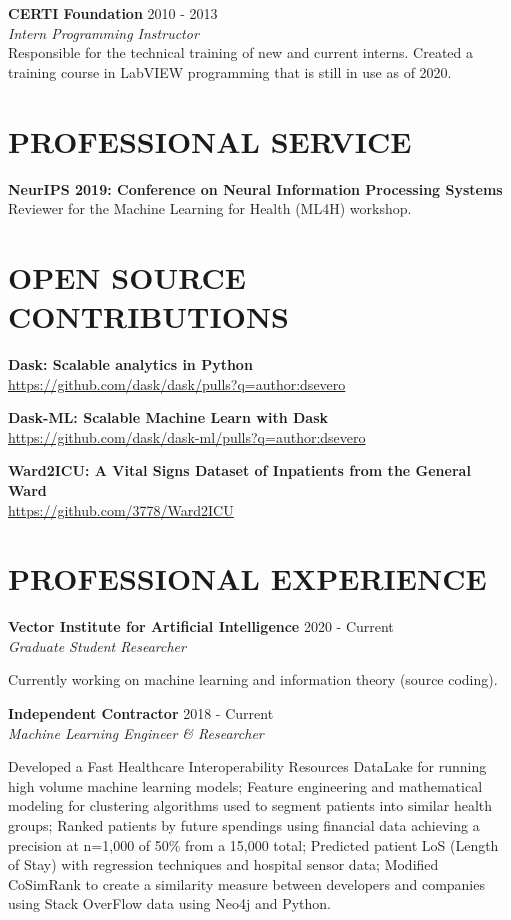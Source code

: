 \documentclass[margin, line]{res}
\begin{document}
\begin{resume}
\textbf{CERTI Foundation} \hfill 2010 - 2013\\
{\sl Intern Programming Instructor}\\
Responsible for the technical training of new and current interns. Created a training course in LabVIEW programming that is still in use as of 2020.

\section{PROFESSIONAL SERVICE}
\textbf{NeurIPS 2019: Conference on Neural Information Processing Systems}\\
Reviewer for the Machine Learning for Health (ML4H) workshop.

\section{OPEN SOURCE CONTRIBUTIONS}
\textbf{Dask: Scalable analytics in Python}\\
\url{https://github.com/dask/dask/pulls?q=author:dsevero}

\textbf{Dask-ML: Scalable Machine Learn with Dask}\\
\url{https://github.com/dask/dask-ml/pulls?q=author:dsevero}

\textbf{Ward2ICU: A Vital Signs Dataset of Inpatients from the General Ward}\\
\url{https://github.com/3778/Ward2ICU}

\section{PROFESSIONAL EXPERIENCE}
\textbf{Vector Institute for Artificial Intelligence} \hfill 2020 - Current\\
{\sl Graduate Student Researcher}\\
\begin{small}
    Currently working on machine learning and information theory (source coding).
\end{small}

\textbf{Independent Contractor} \hfill 2018 - Current\\
{\sl Machine Learning Engineer \& Researcher}\\
\begin{small}
    Developed a Fast Healthcare Interoperability Resources DataLake for running high volume machine learning models; Feature engineering and mathematical modeling for clustering algorithms used to segment patients into similar health groups; Ranked patients by future spendings using financial data achieving a precision at n=1,000 of 50\% from a 15,000 total; Predicted patient LoS (Length of Stay) with regression techniques and hospital sensor data; Modified CoSimRank to create a similarity measure between developers and companies using Stack OverFlow data using Neo4j and Python.
\end{small}


\end{resume}
\end{document}
